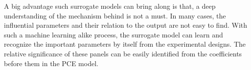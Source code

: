 A big advantage such surrogate models can bring along is that, a deep understanding of the mechanism behind is not a must. In many cases, the influential parameters and their relation to the output are not easy to find. With such a machine learning alike process, the surrogate model can learn and recognize the important parameters by itself from the experimental designs. The relative significance of these panels can be easily identified from the coefficients before them in the PCE model.





























